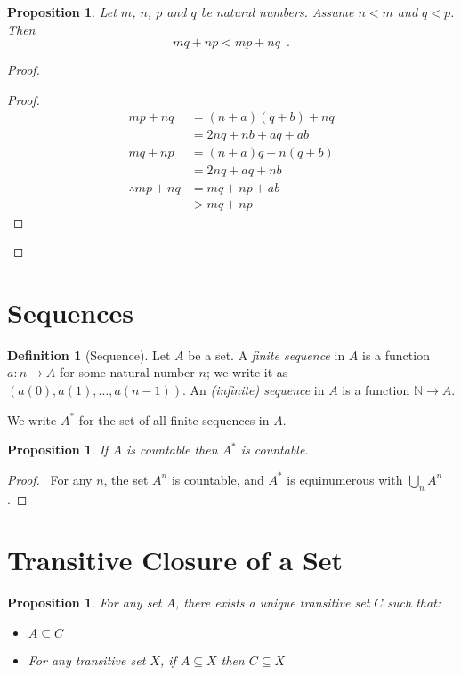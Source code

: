 \documentclass{book}
\let\qed\relax
\newtheorem{prop}[ax]{Proposition}
\theoremstyle{definition}
\newtheorem{df}[ax]{Definition}
\begin{document}
\begin{prop}
\label{prop:intmultlemma}
Let $m$, $n$, $p$ and $q$ be natural numbers. Assume $n < m$ and $q < p$. Then
\[ mq + np < mp + nq \enspace . \]
\end{prop}

\begin{proof}
\pf
{}
\begin{proof}
	\pf
	\begin{align*}
		mp + nq & = (n+a) (q + b) + nq \\
		& = 2nq + nb + aq + ab \\
		mq + np & = (n + a) q + n (q + b) \\
		& = 2nq + aq + nb \\
		\therefore mp + nq & = mq + np + ab \\
		& > mq + np
	\end{align*}
\end{proof}
\qed
\end{proof}

\section{Sequences}

\begin{df}[Sequence]
Let $A$ be a set. A \emph{finite sequence} in $A$ is a function $a : n \rightarrow A$ for some natural number $n$; we write it as $(a(0), a(1), \ldots, a(n-1))$. An \emph{(infinite) sequence} in $A$ is a function $\mathbb{N} \rightarrow A$.

We write $A^*$ for the set of all finite sequences in $A$.
\end{df}

\begin{prop}
If $A$ is countable then $A^*$ is countable.
\end{prop}

\begin{proof}
\pf\ For any $n$, the set $A^n$ is countable, and $A^*$ is equinumerous with $\bigcup_n A^n$. \qed
\end{proof}

\section{Transitive Closure of a Set}

\begin{prop}
For any set $A$, there exists a unique transitive set $C$ such that:
\begin{itemize}
\item $A \subseteq C$
\item For any transitive set $X$, if $A \subseteq X$ then $C \subseteq X$
\end{itemize}
\end{prop}
\end{document}
